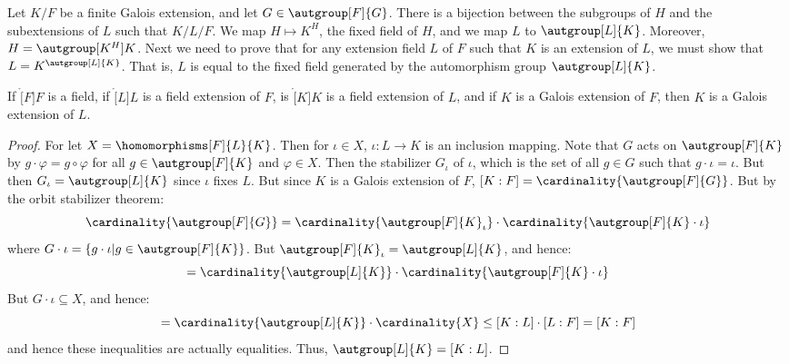 \documentclass{article}                                                        %
\begin{document}
        Let $K/F$ be a finite Galois extension, and let $G\in\autgroup[F]{G}$.
        There is a bijection between the subgroups of $H$ and the subextensions
        of $L$ such that $K/L/F$. We map $H\mapsto{K}^{H}$, the fixed field
        of $H$, and we map $L$ to $\autgroup[L]{K}$. Moreover,
        $H=\autgroup[K^{H}]{K}$. Next we need to prove that for any extension
        field $L$ of $F$ such that $K$ is an extension of $L$, we must show
        that $L=K^{\autgroup[L]{K}}$. That is, $L$ is equal to the fixed field
        generated by the automorphism group $\autgroup[L]{K}$.
        \begin{theorem}
            If $\ring[F]{F}$ is a field, if $\ring[L]{L}$ is a field
            extension of $F$, is $\ring[K]{K}$ is a field extension of $L$,
            and if $K$ is a Galois extension of $F$, then $K$ is a Galois
            extension of $L$.
        \end{theorem}
        \begin{proof}
            For let $X=\homomorphisms[F]{L}{K}$. Then for $\iota\in{X}$,
            $\iota:L\rightarrow{K}$ is an inclusion mapping. Note that
            $G$ acts on $\autgroup[F]{K}$ by $g\cdot\varphi=g\circ\varphi$
            for all $g\in\autgroup[F]{K}$ and $\varphi\in{X}$. Then the
            stabilizer $G_{\iota}$ of $\iota$, which is the set of all
            $g\in{G}$ such that $g\cdot\iota=\iota$. But then
            $G_{\iota}=\autgroup[L]{K}$ since $\iota$ fixes $L$. But since $K$
            is a Galois extension of $F$,
            $[K:F]=\cardinality{\autgroup[F]{G}}$. But by the orbit stabilizer
            theorem:
            \begin{equation}
                \cardinality{\autgroup[F]{G}}
                =\cardinality{\autgroup[F]{K}_{\iota}}\cdot
                    \cardinality{\autgroup[F]{K}\cdot\iota}
            \end{equation}
            where $G\cdot\iota=\{g\cdot\iota|g\in\autgroup[F]{K}\}$. But
            $\autgroup[F]{K}_{\iota}=\autgroup[L]{K}$, and hence:
            \begin{equation}
                [K:F]=\cardinality{\autgroup[L]{K}}\cdot
                    \cardinality{\autgroup[F]{K}\cdot\iota}
            \end{equation}
            But $G\cdot\iota\subseteq{X}$, and hence:
            \begin{equation}
                [K:F]=\cardinality{\autgroup[L]{K}}\cdot\cardinality{X}
                \leq[K:L]\cdot[L:F]=[K:F]
            \end{equation}
            and hence these inequalities are actually equalities. Thus,
            $\autgroup[L]{K}=[K:L]$.
        \end{proof}
\end{document}
